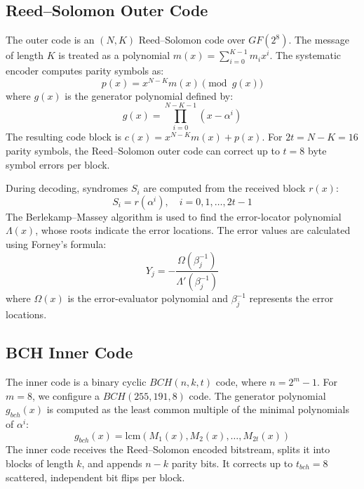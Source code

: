 \documentclass[conference]{IEEEtran}
\begin{document}
\subsection{Reed--Solomon Outer Code}
The outer code is an $(N, K)$ Reed--Solomon code over $GF(2^8)$. The message of length $K$ is treated as a polynomial $m(x) = \sum_{i=0}^{K-1} m_i x^i$. The systematic encoder computes parity symbols as:
\begin{equation}
p(x) = x^{N-K} m(x) \pmod{g(x)}
\end{equation}
where $g(x)$ is the generator polynomial defined by:
\begin{equation}
g(x) = \prod_{i=0}^{N-K-1} (x - \alpha^i)
\end{equation}
The resulting code block is $c(x) = x^{N-K} m(x) + p(x)$. For $2t = N-K = 16$ parity symbols, the Reed--Solomon outer code can correct up to $t = 8$ byte symbol errors per block. 

During decoding, syndromes $S_i$ are computed from the received block $r(x)$:
\begin{equation}
S_i = r(\alpha^i), \quad i = 0, 1, \dots, 2t-1
\end{equation}
The Berlekamp--Massey algorithm is used to find the error-locator polynomial $\Lambda(x)$, whose roots indicate the error locations. The error values are calculated using Forney's formula:
\begin{equation}
Y_j = - \frac{\Omega(\beta_j^{-1})}{\Lambda'(\beta_j^{-1})}
\end{equation}
where $\Omega(x)$ is the error-evaluator polynomial and $\beta_j^{-1}$ represents the error locations.

\subsection{BCH Inner Code}
The inner code is a binary cyclic $BCH(n, k, t)$ code, where $n = 2^{m} - 1$. For $m=8$, we configure a $BCH(255, 191, 8)$ code. The generator polynomial $g_{bch}(x)$ is computed as the least common multiple of the minimal polynomials of $\alpha^i$:
\begin{equation}
g_{bch}(x) = \text{lcm}(M_1(x), M_2(x), \dots, M_{2t}(x))
\end{equation}
The inner code receives the Reed--Solomon encoded bitstream, splits it into blocks of length $k$, and appends $n-k$ parity bits. It corrects up to $t_{bch} = 8$ scattered, independent bit flips per block.
\end{document}
